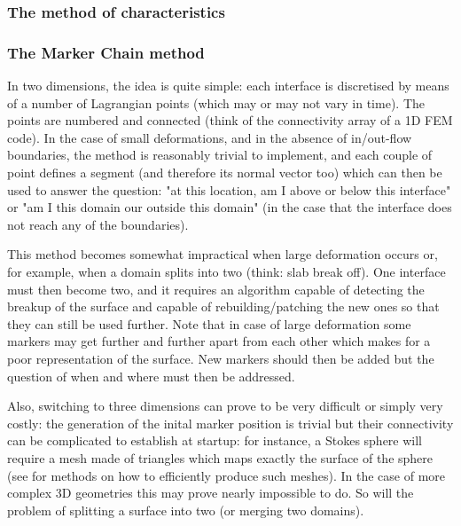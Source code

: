 \cite{hini81}

\subsubsection{The method of characteristics}


\cite{devv00a}

\subsubsection{The Marker Chain method}

In two dimensions, the idea is quite simple: each interface is discretised by means of a number
of Lagrangian points (which may or may not vary in time). The points are numbered and 
connected (think of the connectivity array of a 1D FEM code). In the case of small deformations, 
and in the absence of in/out-flow boundaries, the method is reasonably trivial to implement, and 
each couple of point defines a segment (and therefore its normal vector too) which can then be used
to answer the question: "at this location, am I above or below this interface" or "am I this domain our
outside this domain" (in the case that the interface does not reach any of the boundaries).

This method becomes somewhat impractical when large deformation occurs or, for example, 
when a domain splits into two (think: slab break off). One interface must then become two, 
and it requires an algorithm capable of detecting the breakup of the surface and capable 
of rebuilding/patching the new ones so that they can still be used further. 
Note that in case of large deformation some markers may get further and further apart 
from each other which makes for a poor representation of the surface. New markers should then 
be added but the question of when and where must then be addressed.

Also, switching to three dimensions can prove to be very difficult or simply very 
costly: the generation of the inital marker position is trivial but their connectivity 
can be complicated to establish at startup: for instance, a Stokes sphere will require
a mesh made of triangles which maps exactly the surface of the sphere (see \cite{thie18,moma19} 
for methods on how to efficiently produce such meshes). In the case of more complex 3D geometries
this may prove nearly impossible to do. So will the problem of splitting a surface into two 
(or merging two domains).  

